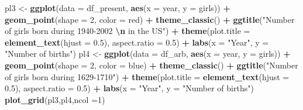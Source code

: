 \documentclass[11pt,a4paper,]{article}
\newenvironment{Shaded}{\begin{snugshade}}{\end{snugshade}}
\newcommand{\AttributeTok}[1]{\textcolor[rgb]{0.13,0.29,0.53}{#1}}
\newcommand{\DecValTok}[1]{\textcolor[rgb]{0.00,0.00,0.81}{#1}}
\newcommand{\FloatTok}[1]{\textcolor[rgb]{0.00,0.00,0.81}{#1}}
\newcommand{\FunctionTok}[1]{\textcolor[rgb]{0.13,0.29,0.53}{\textbf{#1}}}
\newcommand{\NormalTok}[1]{#1}
\newcommand{\OtherTok}[1]{\textcolor[rgb]{0.56,0.35,0.01}{#1}}
\newcommand{\SpecialCharTok}[1]{\textcolor[rgb]{0.81,0.36,0.00}{\textbf{#1}}}
\newcommand{\StringTok}[1]{\textcolor[rgb]{0.31,0.60,0.02}{#1}}
\begin{document}
\begin{Shaded}
\begin{Highlighting}[]
\NormalTok{pl3 }\OtherTok{\textless{}{-}} \FunctionTok{ggplot}\NormalTok{(}\AttributeTok{data =}\NormalTok{ df\_present, }\FunctionTok{aes}\NormalTok{(}\AttributeTok{x =}\NormalTok{ year, }\AttributeTok{y =}\NormalTok{ girls)) }\SpecialCharTok{+}
  \FunctionTok{geom\_point}\NormalTok{(}\AttributeTok{shape =} \DecValTok{2}\NormalTok{, }\AttributeTok{color =} \StringTok{\textquotesingle{}red\textquotesingle{}}\NormalTok{) }\SpecialCharTok{+} \FunctionTok{theme\_classic}\NormalTok{() }\SpecialCharTok{+} 
  \FunctionTok{ggtitle}\NormalTok{(}\StringTok{"Number of girls born during 1940{-}2002 }\SpecialCharTok{\textbackslash{}n}\StringTok{ in the US"}\NormalTok{) }\SpecialCharTok{+} 
  \FunctionTok{theme}\NormalTok{(}\AttributeTok{plot.title =} \FunctionTok{element\_text}\NormalTok{(}\AttributeTok{hjust =} \FloatTok{0.5}\NormalTok{), }\AttributeTok{aspect.ratio =} \FloatTok{0.5}\NormalTok{) }\SpecialCharTok{+} \FunctionTok{labs}\NormalTok{(}\AttributeTok{x =} \StringTok{"Year"}\NormalTok{, }
                                                                           \AttributeTok{y =} \StringTok{"Number of births"}\NormalTok{)}
\NormalTok{pl4 }\OtherTok{\textless{}{-}} \FunctionTok{ggplot}\NormalTok{(}\AttributeTok{data =}\NormalTok{ df\_arb, }\FunctionTok{aes}\NormalTok{(}\AttributeTok{x =}\NormalTok{ year, }\AttributeTok{y =}\NormalTok{ girls)) }\SpecialCharTok{+}
  \FunctionTok{geom\_point}\NormalTok{(}\AttributeTok{shape =} \DecValTok{2}\NormalTok{, }\AttributeTok{color =} \StringTok{\textquotesingle{}blue\textquotesingle{}}\NormalTok{) }\SpecialCharTok{+} \FunctionTok{theme\_classic}\NormalTok{() }\SpecialCharTok{+} 
  \FunctionTok{ggtitle}\NormalTok{(}\StringTok{"Number of girls born during 1629{-}1710"}\NormalTok{) }\SpecialCharTok{+} 
  \FunctionTok{theme}\NormalTok{(}\AttributeTok{plot.title =} \FunctionTok{element\_text}\NormalTok{(}\AttributeTok{hjust =} \FloatTok{0.5}\NormalTok{), }\AttributeTok{aspect.ratio =} \FloatTok{0.5}\NormalTok{) }\SpecialCharTok{+} \FunctionTok{labs}\NormalTok{(}\AttributeTok{x =} \StringTok{"Year"}\NormalTok{, }
                                                                           \AttributeTok{y =} \StringTok{"Number of births"}\NormalTok{)}
\FunctionTok{plot\_grid}\NormalTok{(pl3,pl4,}\AttributeTok{ncol =}\DecValTok{1}\NormalTok{)}
\end{Highlighting}
\end{Shaded}
\end{document}
